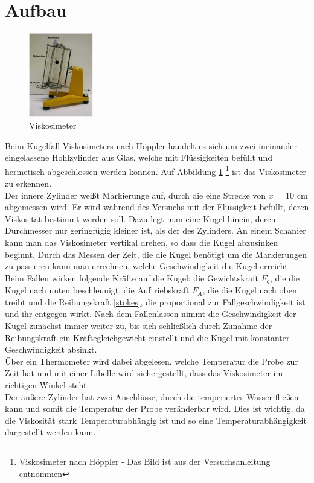 	\section{Aufbau}
\begin{figure}
	\includegraphics[width=0.25\textwidth]{pics/aufbau.jpg}
	\caption{Viskosimeter}
	\label{aufbau}
\end{figure}

Beim Kugelfall-Viskosimeters nach Höppler handelt es sich um zwei ineinander eingelassene Hohlzylinder aus Glas, welche mit Flüssigkeiten befüllt und hermetisch abgeschlossen werden können. Auf Abbildung \ref{aufbau} \footnote{Viskosimeter nach Höppler - Das Bild ist aus der Versuchsanleitung entnommen} ist das Viskosimeter zu erkennen.\\
Der innere Zylinder weißt Markierunge auf, durch die eine Strecke von $x$ = 10 cm abgemessen wird. Er wird während des Versuchs mit der Flüssigkeit befüllt, deren Viskosität bestimmt werden soll. Dazu legt man eine Kugel hinein, deren Durchmesser nur geringfügig kleiner ist, als der des Zylinders. An einem Schanier kann man das Viskosimeter vertikal drehen, so dass die Kugel abzusinken beginnt. Durch das Messen der Zeit, die die Kugel benötigt um die Markierungen zu passieren kann man errechnen, welche Geschwindigkeit die Kugel erreicht.\\
Beim Fallen wirken folgende Kräfte auf die Kugel: die Gewichtskraft $F_g$, die die Kugel nach unten beschleunigt, die Auftriebskraft $F_A$, die die Kugel nach oben treibt und die Reibungskraft \eqref{stokes}, die proportional zur Fallgeschwindigkeit ist und ihr entgegen wirkt. Nach dem Fallenlassen nimmt die Geschwindigkeit der Kugel zunächst immer weiter zu, bis sich schließlich durch Zunahme der Reibungskraft ein Kräftegleichgewicht einstellt und die Kugel mit konstanter Geschwindigkeit absinkt.\\
Über ein Thermometer wird dabei abgelesen, welche Temperatur die Probe zur Zeit hat und mit einer Libelle wird sichergestellt, dass das Viskosimeter im richtigen Winkel steht.\\
Der äußere Zylinder hat zwei Anschlüsse, durch die temperiertes Wasser fließen kann und somit die Temperatur der Probe veränderbar wird. Dies ist wichtig, da die Viskosität stark Temperaturabhängig ist und so eine Temperaturabhängigkeit dargestellt werden kann. 

